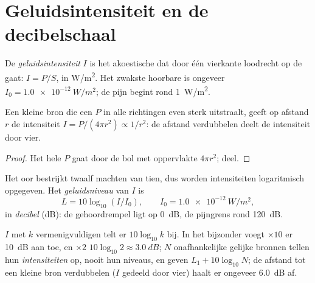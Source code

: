\section{Geluidsintensiteit en de decibelschaal}

\begin{definition}[Geluidsintensiteit]\label{def:g12:sound-acoustics:intensity}
De \emph{geluidsintensiteit} $I$ is het
akoestische  dat door één vierkante  loodrecht op de 
gaat: $I = P/S$, in \unit{W/m^2}. Het zwakste hoorbare  is ongeveer
$I_0 = \qty{1.0e-12}{W/m^2}$; de pijn begint rond \qty{1}{W/m^2}.
\end{definition}

\begin{proposition}\label{prop:g12:sound-acoustics:inverse-square}
%
Een kleine bron die een  $P$ in alle richtingen even sterk
uitstraalt, geeft op afstand $r$ de intensiteit
$I = P/(4\pi r^2) \propto 1/r^2$: de afstand verdubbelen deelt de
intensiteit door vier.
\end{proposition}

\begin{proof}
Het hele  $P$ gaat door de bol met oppervlakte $4\pi r^2$; deel.
\end{proof}

\begin{definition}[Geluidsniveau]\label{def:g12:sound-acoustics:level}
Het oor bestrijkt twaalf machten van tien, dus worden intensiteiten
logaritmisch opgegeven. Het \emph{geluidsniveau} van
$I$ is
\[ L = 10 \log_{10}(I/I_0), \qquad I_0 = \qty{1.0e-12}{W/m^2}, \]
in \emph{decibel} (\unit{dB}): de gehoordrempel ligt op
\qty{0}{dB}, de pijngrens rond \qty{120}{dB}.
\end{definition}

\begin{proposition}\label{prop:g12:sound-acoustics:db-arithmetic}
$I$ met $k$ vermenigvuldigen telt er $10\log_{10}k$  bij. In het
bijzonder voegt $\times 10$ er \qty{10}{dB} aan toe, en $\times 2$
$10\log_{10}2 \approx \qty{3.0}{dB}$; $N$ onafhankelijke gelijke bronnen
tellen hun \emph{intensiteiten} op, nooit hun niveaus, en geven
$L_1 + 10\log_{10}N$; de afstand tot een kleine bron verdubbelen ($I$
gedeeld door vier) haalt er ongeveer \qty{6.0}{dB} af.
\end{proposition}

